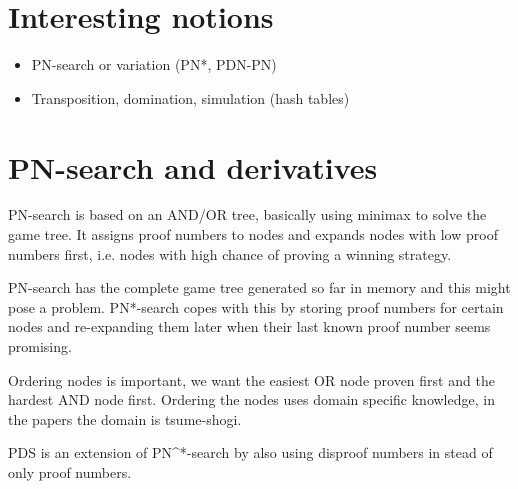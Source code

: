 \documentclass{article}
\begin{document}
\section{Interesting notions}
\begin{itemize}
\item PN-search or variation (PN*, PDN-PN)
\item Transposition, domination, simulation (hash tables)

\end{itemize}

\section{PN-search and derivatives}
PN-search is based on an AND/OR tree, basically using minimax to solve the game tree. It assigns proof numbers to nodes and expands nodes with low proof numbers first, i.e. nodes with high chance of proving a winning strategy.

PN-search has the complete game tree generated so far in memory and this might pose a problem. PN*-search copes with this by storing proof numbers for certain nodes and re-expanding them later when their last known proof number seems promising.

Ordering nodes is important, we want the easiest OR node proven first and the hardest AND node first. Ordering the nodes uses domain specific knowledge, in the papers the domain is tsume-shogi.

PDS is an extension of PN^*-search by also using disproof numbers in stead of only proof numbers.
\end{document}
